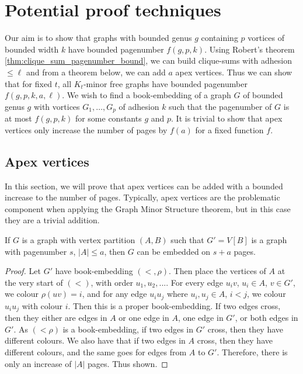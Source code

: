 
\chapter{Potential proof techniques}\label{chap:Proving_The_Theorem}
Our aim is to show that graphs with bounded genus \(g\) containing \(p\) vortices of bounded width \(k\) have bounded pagenumber \(f(g, p, k)\).
Using Robert's theorem \cref{thm:clique_sum_pagenumber_bound}, we can build clique-sums with adhesion \(\leq \ell\) and from a theorem below, we can add \(a\) apex vertices. 
Thus we can show that for fixed \(t\), all \(K_t\)-minor free graphs have bounded pagenumber \(f(g, p, k, a, \ell)\). 
We wish to find a book-embedding of a graph \(G\) of bounded genus \(g\) with vortices \(G_1, \ldots, G_p\) of adhesion \(k\) such that the pagenumber of \(G\) is at most \(f(g, p, k)\) for some constants \(g\) and \(p\). It is trivial to show that apex vertices only increase the number of pages by \(f(a)\) for a fixed function \(f\). 
\section{Apex vertices}
In this section, we will prove that apex vertices can be added with a bounded increase to the number of pages. Typically, apex vertices are the problematic component when applying the Graph Minor Structure theorem, but in this case they are a trivial addition.
\begin{theorem}\label{thm:apex_vertices_pagenumber}
	If \(G\) is a graph with vertex partition \((A, B)\) such that \(G' = V[B]\) is a graph with pagenumber \(s\), \(|A| \leq a\), then \(G\) can be embedded on \(s + a \) pages. 
\end{theorem}
\begin{proof}
	Let \(G'\) have book-embedding \((<, \rho)\). Then place the vertices of \(A\) at the very start of \((<)\), with order $u_1, u_2, ...$. For every edge \(u_i v \), \(u_i \in A\), \(v \in G'\), we colour \(\rho(uv) = i\), and for any edge \(u_i u_j\) where $u_i, u_j \in A$, $i < j$, we colour $u_i u_j$ with colour $i$. Then this is a proper book-embedding. If two edges cross, then they either are edges in $A$ or one edge in $A$, one edge in $G'$, or both edges in $G'$. As $(< \rho)$ is a book-embedding, if two edges in $G'$ cross, then they have different colours. We also have that if two edges in $A$ cross, then they have different colours, and the same goes for edges from $A$ to $G'$. Therefore, there is only an increase of $|A|$ pages. Thus shown. 
\end{proof}

